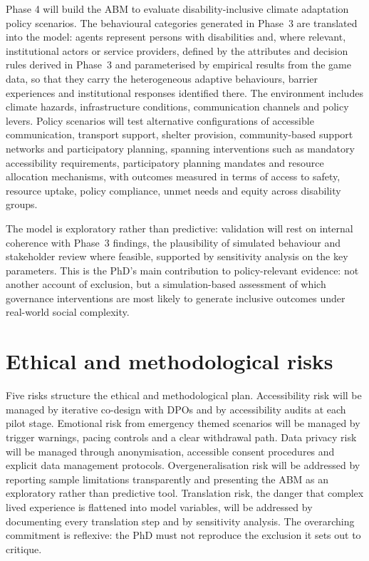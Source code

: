 \documentclass[12pt,a4paper]{report}
\begin{document}
Phase 4 will build the ABM to evaluate disability-inclusive climate adaptation policy scenarios. The behavioural categories generated in Phase~3 are translated into the model: agents represent persons with disabilities and, where relevant, institutional actors or service providers, defined by the attributes and decision rules derived in Phase~3 and parameterised by empirical results from the game data, so that they carry the heterogeneous adaptive behaviours, barrier experiences and institutional responses identified there. The environment includes climate hazards, infrastructure conditions, communication channels and policy levers. Policy scenarios will test alternative configurations of accessible communication, transport support, shelter provision, community-based support networks and participatory planning, spanning interventions such as mandatory accessibility requirements, participatory planning mandates and resource allocation mechanisms, with outcomes measured in terms of access to safety, resource uptake, policy compliance, unmet needs and equity across disability groups.

The model is exploratory rather than predictive: validation will rest on internal coherence with Phase~3 findings, the plausibility of simulated behaviour and stakeholder review where feasible, supported by sensitivity analysis on the key parameters. This is the PhD's main contribution to policy-relevant evidence: not another account of exclusion, but a simulation-based assessment of which governance interventions are most likely to generate inclusive outcomes under real-world social complexity.


\section{Ethical and methodological risks}
Five risks structure the ethical and methodological plan. Accessibility risk will be managed by iterative co-design with DPOs and by accessibility audits at each pilot stage. Emotional risk from emergency themed scenarios will be managed by trigger warnings, pacing controls and a clear withdrawal path. Data privacy risk will be managed through anonymisation, accessible consent procedures and explicit data management protocols. Overgeneralisation risk will be addressed by reporting sample limitations transparently and presenting the ABM as an exploratory rather than predictive tool. Translation risk, the danger that complex lived experience is flattened into model variables, will be addressed by documenting every translation step and by sensitivity analysis. The overarching commitment is reflexive: the PhD must not reproduce the exclusion it sets out to critique.
\end{document}
